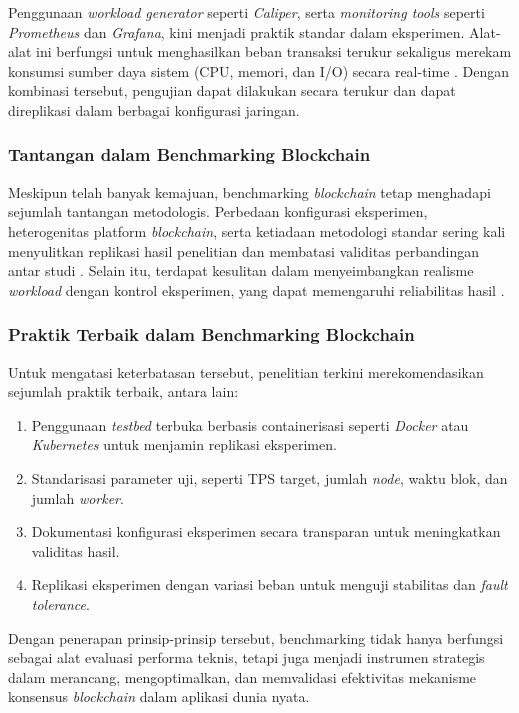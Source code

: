 Penggunaan \textit{workload generator} seperti \textit{Caliper}, serta \textit{monitoring tools} seperti \textit{Prometheus} dan \textit{Grafana}, kini menjadi praktik standar dalam eksperimen. Alat-alat ini berfungsi untuk menghasilkan beban transaksi terukur sekaligus merekam konsumsi sumber daya sistem (CPU, memori, dan I/O) secara real-time \cite{thakkar2018, nasrulin2022, ren2023}. Dengan kombinasi tersebut, pengujian dapat dilakukan secara terukur dan dapat direplikasi dalam berbagai konfigurasi jaringan.

\subsubsection{Tantangan dalam Benchmarking Blockchain}

Meskipun telah banyak kemajuan, benchmarking \textit{blockchain} tetap menghadapi sejumlah tantangan metodologis. Perbedaan konfigurasi eksperimen, heterogenitas platform \textit{blockchain}, serta ketiadaan metodologi standar sering kali menyulitkan replikasi hasil penelitian dan membatasi validitas perbandingan antar studi \cite{dinh2017, gramoli2023}. Selain itu, terdapat kesulitan dalam menyeimbangkan realisme \textit{workload} dengan kontrol eksperimen, yang dapat memengaruhi reliabilitas hasil \cite{thakkar2018, ren2023}.

\subsubsection{Praktik Terbaik dalam Benchmarking Blockchain}

Untuk mengatasi keterbatasan tersebut, penelitian terkini merekomendasikan sejumlah praktik terbaik, antara lain:
\begin{enumerate}[nolistsep]
    \item Penggunaan \textit{testbed} terbuka berbasis containerisasi seperti \textit{Docker} atau \textit{Kubernetes} untuk menjamin replikasi eksperimen.
    \item Standarisasi parameter uji, seperti TPS target, jumlah \textit{node}, waktu blok, dan jumlah \textit{worker}.
    \item Dokumentasi konfigurasi eksperimen secara transparan untuk meningkatkan validitas hasil.
    \item Replikasi eksperimen dengan variasi beban untuk menguji stabilitas dan \textit{fault tolerance}.
\end{enumerate}

Dengan penerapan prinsip-prinsip tersebut, benchmarking tidak hanya berfungsi sebagai alat evaluasi performa teknis, tetapi juga menjadi instrumen strategis dalam merancang, mengoptimalkan, dan memvalidasi efektivitas mekanisme konsensus \textit{blockchain} dalam aplikasi dunia nyata.


